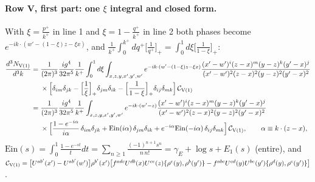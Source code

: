 \documentclass[10pt]{article}
\numberwithin{equation}{section}
\newcommand{\Ein}{\mathrm{Ein}}
\begin{document}
\paragraph{Row V, first part: one $\xi$ integral and closed form.} With $\xi=\frac{p^+}{k^+}$ in line 1 and $\xi=1-\frac{q^+}{k^+}$ in line 2 both phases become $e^{-ik\cdot(w'-(1-\xi)z-\xi x)}$, and $\frac{1}{k^+}\int_0^{k^+}dq^+\big[\frac{1}{q^+}\big]_+=\int_0^1d\xi\big[\frac{1}{1-\xi}\big]_+$:
\begin{align}
\frac{d^3N_{\rm V(1)}}{d^3k}={}&\frac{1}{(2\pi)^3}\frac{ig^4}{32\pi^5}\frac{1}{k^+}\int_0^1d\xi\int_{x,z,y,x',y',w'}e^{-ik\cdot(w'-(1-\xi)z-\xi x)}\frac{(x'-w')^{i}(z-x)^{m}(y-z)^{k}(y'-x)^{j}}{(x'-w')^{2}(z-x)^{2}(y-z)^{2}(y'-x)^{2}}\notag\\
&\times\Big[\delta_{im}\delta_{jk}-\Big[\frac1\xi\Big]_+\delta_{jm}\delta_{ik}-\Big[\frac{1}{1-\xi}\Big]_+\delta_{ij}\delta_{mk}\Big]\,\mathcal C_{\rm V(1)}\label{eq:V1xi}\\
={}&\frac{1}{(2\pi)^3}\frac{ig^4}{32\pi^5}\frac{1}{k^+}\int_{x,z,y,x',y',w'}e^{-ik\cdot(w'-z)}\frac{(x'-w')^{i}(z-x)^{m}(y-z)^{k}(y'-x)^{j}}{(x'-w')^{2}(z-x)^{2}(y-z)^{2}(y'-x)^{2}}\notag\\
&\times\Big[\frac{1-e^{-i\alpha}}{i\alpha}\,\delta_{im}\delta_{jk}+\Ein(i\alpha)\,\delta_{jm}\delta_{ik}+e^{-i\alpha}\Ein(-i\alpha)\,\delta_{ij}\delta_{mk}\Big]\,\mathcal C_{\rm V(1)},\qquad\alpha\equiv k\cdot(z-x),\label{eq:V1cf}
\end{align}
$\Ein(s)=\int_0^1\frac{1-e^{-st}}{t}dt=\sum_{n\ge1}\frac{(-1)^{n+1}s^n}{n\,n!}=\gamma_E+\log s+E_1(s)$ (entire), and $\mathcal C_{\rm V(1)}=\big[U^{ab'}(x')-U^{ab'}(w')\big]\rho^{b'}(x')\big[f^{adc}U^{db}(x)U^{ce}(z)\{\rho^e(y),\rho^b(y')\}-f^{abc}U^{cd}(y)U^{be}(y')\{\rho^d(y),\rho^e(y')\}\big]$.
\end{document}

